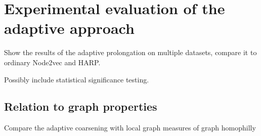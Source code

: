 \section{Experimental evaluation of the adaptive approach}
Show the results of the adaptive prolongation on multiple datasets, compare it to ordinary Node2vec and HARP.

Possibly include statistical significance testing.

\subsection{Relation to graph properties}
Compare the adaptive coarsening with local graph measures of graph homophilly
